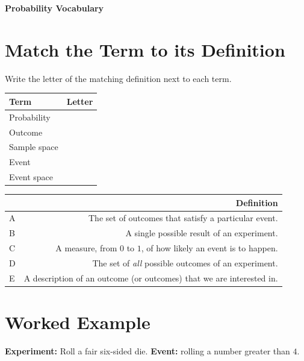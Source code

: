 \documentclass[11pt]{article}
\begin{document}
\thispagestyle{firstpage}

\begin{center}
  {\Large\bfseries Probability Vocabulary}
\end{center}
\vspace{0.3em}

\section*{Match the Term to its Definition}
\noindent Write the letter of the matching definition next to each term.

\begin{center}
\begin{tabular}{|T|M|}
\hline
\textbf{Term} & \textbf{Letter} \\\hline
Probability & \\[0.9em]\hline
Outcome & \\[0.9em]\hline
Sample space & \\[0.9em]\hline
Event & \\[0.9em]\hline
Event space & \\[0.9em]\hline
\end{tabular}
\end{center}

\vspace{0.4em}
\begin{center}
\begin{tabular}{|M|D|}
\hline
\textbf{} & \textbf{Definition} \\\hline
A & The set of outcomes that satisfy a particular event. \\[0.6em]\hline
B & A single possible result of an experiment. \\[0.6em]\hline
C & A measure, from $0$ to $1$, of how likely an event is to happen. \\[0.6em]\hline
D & The set of \emph{all} possible outcomes of an experiment. \\[0.6em]\hline
E & A description of an outcome (or outcomes) that we are interested in. \\[0.6em]\hline
\end{tabular}
\end{center}

\vspace{0.6em}
\section*{Worked Example}
\noindent \textbf{Experiment:} Roll a fair six-sided die. \quad \textbf{Event:} rolling a number
greater than $4$.
\end{document}
